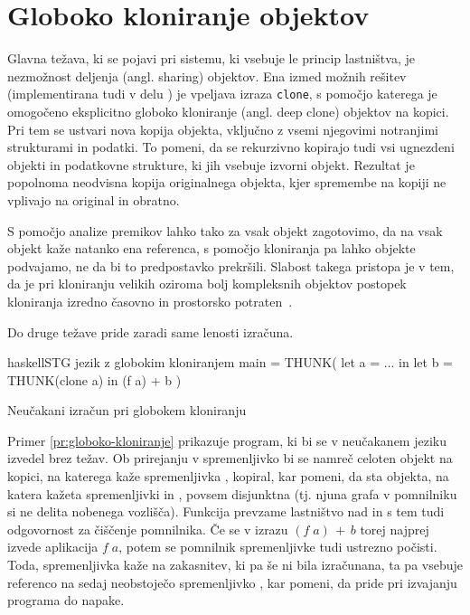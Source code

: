 
\section{Globoko kloniranje objektov}

Glavna težava, ki se pojavi pri sistemu, ki vsebuje le princip lastništva, je nezmožnost deljenja (angl. sharing) objektov. Ena izmed možnih rešitev (implementirana tudi v delu \cite{marshall2024functional}) je vpeljava izraza \texttt{clone}, s pomočjo katerega je omogočeno eksplicitno globoko kloniranje (angl. deep clone) objektov na kopici. Pri tem se ustvari nova kopija objekta, vključno z vsemi njegovimi notranjimi strukturami in podatki. To pomeni, da se rekurzivno kopirajo tudi vsi ugnezdeni objekti in podatkovne strukture, ki jih vsebuje izvorni objekt. Rezultat je popolnoma neodvisna kopija originalnega objekta, kjer spremembe na kopiji ne vplivajo na original in obratno.

S pomočjo analize premikov lahko tako za vsak objekt zagotovimo, da na vsak objekt kaže natanko ena referenca, s pomočjo kloniranja pa lahko objekte podvajamo, ne da bi to predpostavko prekršili. Slabost takega pristopa je v tem, da je pri kloniranju velikih oziroma bolj kompleksnih objektov postopek kloniranja izredno časovno in prostorsko potraten~\cite{wadler1990linear, lafont1988linear}.

Do druge težave pride zaradi same lenosti izračuna.

\begin{primer}[ht]
\centering
\begin{code-box}{haskell}{STG jezik z globokim kloniranjem \xmark}
main = THUNK(
    let a = ... in
    let b = THUNK(clone a) in
        (f a) + b
)
\end{code-box}
\caption{Neučakani izračun pri globokem kloniranju}
\label{pr:globoko-kloniranje}
\end{primer}

Primer \ref{pr:globoko-kloniranje} prikazuje program, ki bi se v neučakanem jeziku izvedel brez težav. Ob prirejanju v spremenljivko  bi se namreč celoten objekt na kopici, na katerega kaže spremenljivka , kopiral, kar pomeni, da sta objekta, na katera kažeta spremenljivki  in , povsem disjunktna (tj. njuna grafa v pomnilniku si ne delita nobenega vozlišča). Funkcija  prevzame lastništvo nad  in s tem tudi odgovornost za čiščenje pomnilnika. Če se v izrazu $(f \; a) \, + \, b$ torej najprej izvede aplikacija $f \; a$, potem se pomnilnik spremenljivke  tudi ustrezno počisti. Toda, spremenljivka  kaže na zakasnitev, ki pa še ni bila izračunana, ta pa vsebuje referenco na sedaj neobstoječo spremenljivko , kar pomeni, da pride pri izvajanju programa do napake.

